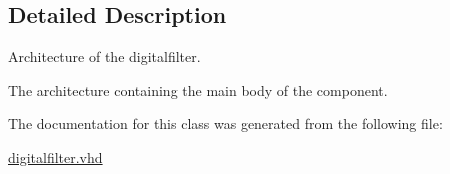 \subsection{Detailed Description}
Architecture of the digitalfilter. 

The architecture containing the main body of the component. 

The documentation for this class was generated from the following file\-:\begin{DoxyCompactItemize}
\item 
\hyperlink{digitalfilter_8vhd}{digitalfilter.\-vhd}\end{DoxyCompactItemize}
